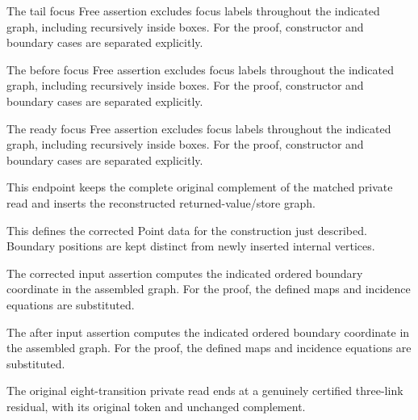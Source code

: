 The tail focus Free assertion excludes focus labels throughout the indicated graph, including recursively inside boxes.
For the proof, constructor and boundary cases are separated explicitly.
\par{}

The before focus Free assertion excludes focus labels throughout the indicated graph, including recursively inside boxes.
For the proof, constructor and boundary cases are separated explicitly.
\par{}

The ready focus Free assertion excludes focus labels throughout the indicated graph, including recursively inside boxes.
For the proof, constructor and boundary cases are separated explicitly.
\par{}

This endpoint keeps the complete original complement of the matched private read and inserts the reconstructed returned-value/store graph.
\par{}

This defines the corrected Point data for the construction just described. Boundary positions are kept distinct from newly inserted internal vertices.
\par{}

The corrected input assertion computes the indicated ordered boundary coordinate in the assembled graph.
For the proof, the defined maps and incidence equations are substituted.
\par{}

The after input assertion computes the indicated ordered boundary coordinate in the assembled graph.
For the proof, the defined maps and incidence equations are substituted.
\par{}

The original eight-transition private read ends at a genuinely certified three-link residual, with its original token and unchanged complement.
\par{}

